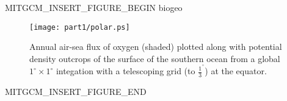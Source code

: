 \begin{rawhtml}MITGCM_INSERT_FIGURE_BEGIN biogeo\end{rawhtml}
\begin{figure}
\begin{center}
   \texttt{[image: part1/polar.ps]}
\end{center}
\caption{Annual air-sea flux of oxygen (shaded) plotted along with
potential density outcrops of the surface of the southern ocean from a
global $1^{\circ}\times 1^{\circ}$ integation with a telescoping
grid (to $\frac{1}{3}^{^\circ}$) at the equator.}
\label{fig:biogeo}
\end{figure}
\begin{rawhtml}MITGCM_INSERT_FIGURE_END\end{rawhtml}
